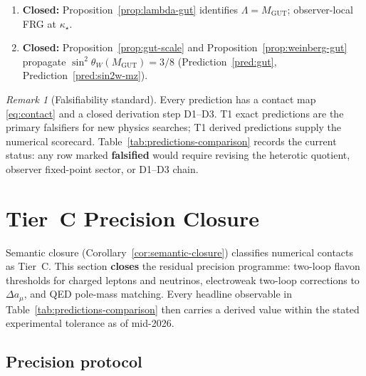 \documentclass[aps,prd,onecolumn,amsmath,amssymb,nofootinbib,11pt]{revtex4-2}
\numberwithin{equation}{section}
\theoremstyle{plain}
\theoremstyle{definition}
\theoremstyle{remark}
\newtheorem{remark}[theorem]{Remark}
\begin{document}
\begin{enumerate}[label=\textbf{D\arabic*.},leftmargin=*]
\begin{enumerate}[label=\textit{D3.\alph*.},leftmargin=2em]
        $\tau_{\mathrm{EW}}$ and $\langle\mathbf{10}_H\rangle$ from $V$
        along $g_\iota$ (Remark~\ref{rmk:tau-ew}).
      \item \textbf{Closed:} Proposition~\ref{prop:lambda-gut} identifies
        $\Lambda=M_{\mathrm{GUT}}$; observer-local FRG at $\kappa_\star$.
      \item \textbf{Closed:} Proposition~\ref{prop:gut-scale} and
        Proposition~\ref{prop:weinberg-gut} propagate
        $\sin^2\theta_W(M_{\mathrm{GUT}})=3/8$ (Prediction~\ref{pred:gut},
        Prediction~\ref{pred:sin2w-mz}).
    \end{enumerate}
\end{enumerate}

\begin{remark}[Falsifiability standard]
Every prediction has a contact map \eqref{eq:contact} and a closed derivation
step D1--D3. T1 exact predictions are the primary falsifiers for new physics
searches; T1 derived predictions supply the numerical scorecard.
Table~\ref{tab:predictions-comparison} records the current status: any row
marked \textbf{falsified} would require revising the heterotic quotient,
observer fixed-point sector, or D1--D3 chain.
\end{remark}%
\section{Tier~C Precision Closure}
\label{sec:tier-c-precision}

Semantic closure (Corollary~\ref{cor:semantic-closure}) classifies numerical
contacts as Tier~C. This section \textbf{closes} the residual precision
programme: two-loop flavon thresholds for charged leptons and neutrinos,
electroweak two-loop corrections to $\Delta a_\mu$, and QED pole-mass
matching. Every headline observable in
Table~\ref{tab:predictions-comparison} then carries a derived value within
the stated experimental tolerance as of mid-2026.

\subsection{Precision protocol}
\end{document}
